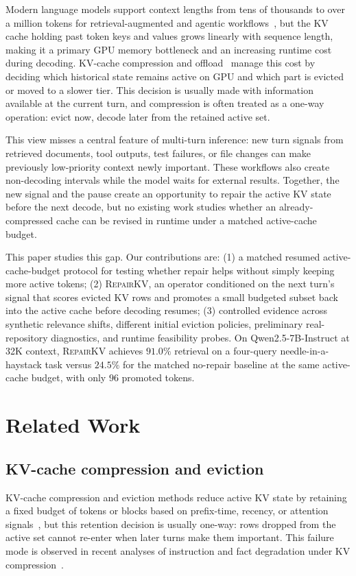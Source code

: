 \documentclass{article}
\newcommand{\repairkv}{\textsc{RepairKV}}
\begin{document}
Modern language models support context lengths from tens of thousands to
over a million tokens for retrieval-augmented and agentic
workflows~\citep{ruler,longbench,inftybench}, but the KV cache holding
past {token} keys and values grows linearly with sequence length, making it a
primary GPU memory bottleneck {and an increasing runtime cost during decoding. KV-cache compression and offload~\citep{snapkv,streamingllm,h2o,vllm}  manage this cost by deciding which historical state remains active on GPU and which part is evicted or moved to a slower tier.} This decision is usually made with information available at the current turn, and compression is often treated as a one-way operation: evict now, decode later from the retained active set.

This view misses a central feature of multi-turn inference: { new turn signals from } retrieved documents, tool outputs, test failures, or file changes
can make previously low-priority context newly important. {These workflows also create} non-decoding intervals while the
model waits for external results. Together, {the new signal and the pause create an opportunity to repair} the active KV state before the next decode, but {no existing work studies whether an already-compressed cache can be revised in runtime under a matched active-cache budget.}

{This paper studies this gap. Our contributions are:} (1) a matched resumed active-cache-budget protocol for testing whether repair helps without simply keeping more active tokens; (2) \repairkv{}, {an operator conditioned on the next turn's signal that scores evicted KV rows and promotes a small budgeted subset back into the active cache before decoding resumes}; (3) controlled evidence across synthetic relevance shifts, different initial eviction policies, preliminary real-repository diagnostics, and runtime feasibility probes. On Qwen2.5-7B-Instruct at 32K context, \repairkv{} achieves $91.0\%$ retrieval on a four-query needle-in-a-haystack task versus $24.5\%$ for the matched no-repair baseline at the same active-cache budget, with only $96$ promoted tokens.

\section{Related Work}
\label{sec:related}

\subsection{KV-cache compression and eviction}
{KV-cache compression and eviction methods reduce active KV state by retaining a fixed budget of tokens or blocks based on prefix-time, recency, or attention signals~\citep{snapkv,streamingllm,h2o,scissorhands,pyramidkv}}, but this retention decision is usually one-way: rows dropped from the active set cannot re-enter when later turns make them important. This failure mode is observed in recent analyses of instruction and fact degradation under KV compression~\citep{pitfalls}.
\end{document}
